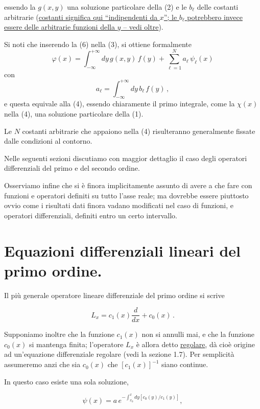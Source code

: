 \documentclass[11pt, a4paper]{book}
\numberwithin{equation}{section}
\begin{document}
essendo la $g(x,y)$ una soluzione particolare della (2) e le $b_\ell$ delle costanti arbitrarie (\underline{costanti significa qui ``indipendenti da $x$''; le $b_\ell$ potrebbero invece essere delle arbitrarie funzioni della $y$ -- vedi oltre}).

Si noti che inserendo la (6) nella (3), si ottiene formalmente
\[
    \varphi(x) = \int_{-\infty}^{+\infty} dy \, g(x,y) \, f(y) + \sum_{\ell=1}^{N} a_\ell \, \psi_\ell(x)
\]
con
\[
    a_\ell = \int_{-\infty}^{+\infty} dy \, b_\ell \, f(y) \,,
\]
e questa equivale alla (4), essendo chiaramente il primo integrale, come la $\chi(x)$ nella (4), una soluzione particolare della (1).

Le $N$ costanti arbitrarie che appaiono nella (4) risulteranno generalmente fissate dalle condizioni al contorno.

Nelle seguenti sezioni discutiamo con maggior dettaglio il caso degli operatori differenziali del primo e del secondo ordine.

Osserviamo infine che si è finora implicitamente assunto di avere a che fare con funzioni e operatori definiti su tutto l'asse reale; ma dovrebbe essere piuttosto ovvio come i risultati dati finora vadano modificati nel caso di funzioni, e operatori differenziali, definiti entro un certo intervallo.


\section{Equazioni differenziali lineari del primo ordine.}

Il più generale operatore lineare differenziale del primo ordine si scrive

\begin{equation}
    L_x = c_1(x) \frac{d}{dx} + c_0(x) \,.
\end{equation}

Supponiamo inoltre che la funzione $c_1(x)$ non si annulli mai, e che la funzione $c_0(x)$ si mantenga finita; l'operatore $L_x$ è allora detto \underline{regolare}, dà cioè origine ad un'equazione differenziale regolare (vedi la sezione 1.7). Per semplicità assumeremo anzi che sia $c_0(x)$ che $[c_1(x)]^{-1}$ siano continue.

In questo caso esiste una sola soluzione,

\begin{equation}
    \psi(x) = a \, e^{\displaystyle -\int_{x_0}^{x} dy \left[ c_0(y) / c_1(y) \right]},
\end{equation}
\end{document}
